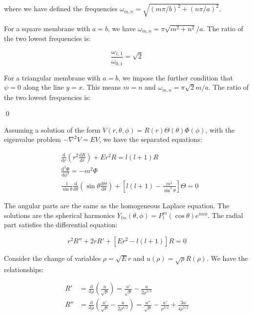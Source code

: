 \documentclass[12pt]{article}
\begin{document}
where we have defined the frequencies $\omega_{m, n} = \sqrt{(m \pi/b)^{2} + (n \pi/a)^{2}}$.

For a square membrane with $a = b$, we have $\omega_{m, n} = \pi \sqrt{m^{2} + n^{2}}/a$. The ratio of the two lowest frequencies is:

\begin{equation}
    \frac{\omega_{1, 1}}{\omega_{0, 1}} = \sqrt{2}
\end{equation}

For a triangular membrane with $a = b$, we impose the further condition that $\psi = 0$ along the line $y = x$. This means $m = n$ and $\omega_{m, n} = \pi \sqrt{2} m/a$. The ratio of the two lowest frequencies is:

\qed



Assuming a solution of the form $V(r, \theta, \phi) = R(r) \Theta(\theta) \Phi(\phi)$, with the eigenvalue problem $-\nabla^{2}V = EV$, we have the separated equations:

\begin{equation}
    \begin{split}
        &\frac{\mathrm{d}}{\mathrm{d}r} \left( r^2 \frac{\mathrm{d}R}{\mathrm{d}r} \right) + E r^{2} R = l(l+1)R \\
        &\frac{\mathrm{d}^{2} \Phi}{\mathrm{d} \phi^2} = -m^2 \Phi \\
        &\frac{1}{\sin{\theta}} \frac{\mathrm{d}}{\mathrm{d} \theta} \left( \sin{\theta} \frac{\mathrm{d} \Theta}{\mathrm{d} \theta} \right) + \left[ l(l+1) - \frac{m^2}{\sin^{2}{\theta}} \right] \Theta = 0
    \end{split}
\end{equation}

The angular parts are the same as the homogeneous Laplace equation. The solutions are the spherical harmonics $Y_{lm}(\theta, \phi) = P_{l}^{m}(\cos{\theta}) e^{im\phi}$. The radial part satisfies the differential equation:

\begin{equation}
    r^{2} R'' + 2r R' + [E r^{2} - l(l+1)] R = 0
\end{equation}

Consider the change of variables $\rho = \sqrt{E} r$ and $u(\rho) = \sqrt{\rho} R(\rho)$. We have the relationships:

\begin{equation}
    \begin{split}
        R' &= \frac{\mathrm{d}}{\mathrm{d}\rho} \left( \frac{u}{\sqrt{\rho}} \right) = \frac{u'}{\sqrt{\rho}} - \frac{u}{2\rho^{3/2}} \\
        R'' &= \frac{\mathrm{d}}{\mathrm{d}\rho} \left( \frac{u'}{\sqrt{\rho}} - \frac{u}{2\rho^{3/2}} \right) = \frac{u''}{\sqrt{\rho}} - \frac{u'}{\rho^{3/2}} + \frac{3u}{4\rho^{5/2}}
    \end{split}
\end{equation}
\end{document}
